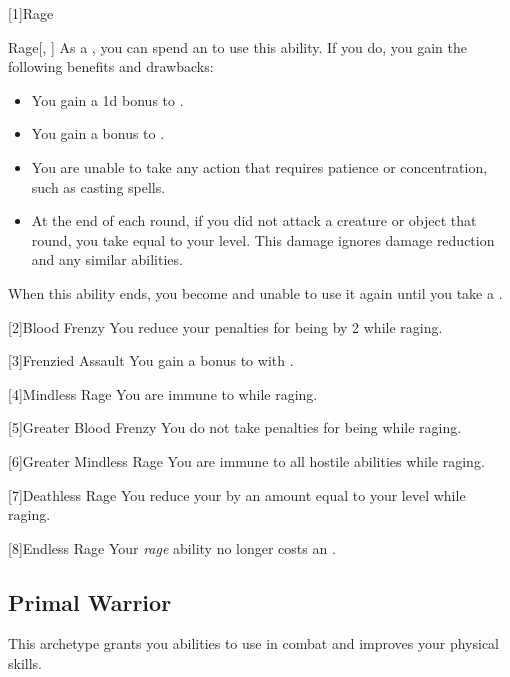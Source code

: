         [1]{Rage}
        \begin{ability}{Rage}[, ]
            As a , you can spend an  to use this ability.
            If you do, you gain the following benefits and drawbacks:
            \begin{itemize}
                \item You gain a \plus1d bonus to .
                \item You gain a  bonus to .
                \item You are unable to take any action that requires patience or concentration, such as casting spells.
                \item At the end of each round, if you did not attack a creature or object that round, you take  equal to your level.
                    This damage ignores damage reduction and any similar abilities.
            \end{itemize}
            When this ability ends, you become \fatigued and unable to use it again until you take a .
        \end{ability}

        [2]{Blood Frenzy}
        You reduce your penalties for being  by 2 while raging.

        [3]{Frenzied Assault}
        You gain a  bonus to  with .

        [4]{Mindless Rage}
        You are immune to   while raging.

        [5]{Greater Blood Frenzy} 
        You do not take penalties for being  while raging.

        [6]{Greater Mindless Rage} 
        You are immune to all hostile  abilities while raging.

        [7]{Deathless Rage} 
        You reduce your  by an amount equal to your level while raging.

        [8]{Endless Rage}
        Your \textit{rage} ability no longer costs an .

    \subsection{Primal Warrior}
        This archetype grants you abilities to use in combat and improves your physical skills.


